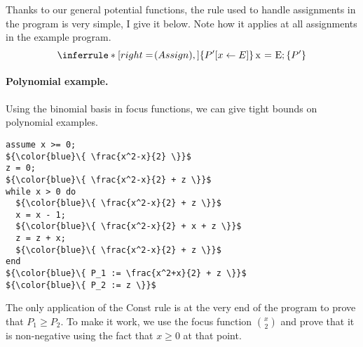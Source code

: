 \documentclass[nocopyrightspace,preprint]{sigplanconf-pldi15}
\begin{document}
Thanks to our general potential functions, the rule used to
handle assignments in the program is very simple, I give it below.
Note how it applies at all assignments in the example program.
$$
\Rule{Assign}
{ }
{\htriple{P'[x \gets E]}{\lstinline{x = E;}}{P'}}
$$

\paragraph{Polynomial example.} Using the binomial basis in
focus functions, we can give tight bounds on polynomial
examples.

\begin{lstlisting}[mathescape]
assume x >= 0;
${\color{blue}\{ \frac{x^2-x}{2} \}}$
z = 0;
${\color{blue}\{ \frac{x^2-x}{2} + z \}}$
while x > 0 do
  ${\color{blue}\{ \frac{x^2-x}{2} + z \}}$
  x = x - 1;
  ${\color{blue}\{ \frac{x^2-x}{2} + x + z \}}$
  z = z + x;
  ${\color{blue}\{ \frac{x^2-x}{2} + z \}}$
end
${\color{blue}\{ P_1 := \frac{x^2+x}{2} + z \}}$
${\color{blue}\{ P_2 := z \}}$
\end{lstlisting}

The only application of the {\sc Const} rule is at the very
end of the program to prove that $P_1 \ge P_2$.  To make it
work, we use the focus function $\binom{x}{2}$ and prove that
it is non-negative using the fact that $x \ge 0$ at that point.
\end{document}

